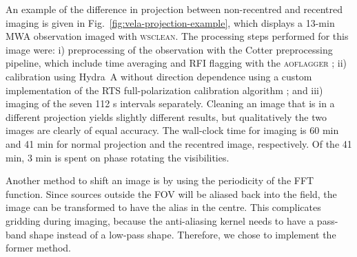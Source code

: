 \documentclass[useAMS,usenatbib]{mn2e}
\begin{document}
An example of the difference in projection between non-recentred and recentred imaging is given in Fig.~\ref{fig:vela-projection-example}, which displays a 13-min MWA observation imaged with \textsc{wsclean}. The processing steps performed for this image were: i) preprocessing of the observation with the Cotter preprocessing pipeline, which include time averaging and RFI flagging with the \textsc{aoflagger} \citep{post-correlation-rfi-classification,scale-invariant-rank-operator}; ii) calibration using Hydra~A without direction dependence using a custom implementation of the RTS full-polarization calibration algorithm \citep{rts-mwa}; and iii) imaging of the seven 112 s intervals separately. Cleaning an image that is in a different projection yields slightly different results, but qualitatively the two images are clearly of equal accuracy. The wall-clock time for imaging is 60 min and 41 min for normal projection and the recentred image, respectively. Of the 41 min, 3 min is spent on phase rotating the visibilities.

Another method to shift an image is by using the periodicity of the FFT function. Since sources outside the FOV will be aliased back into the field, the image can be transformed to have the alias in the centre. This complicates gridding during imaging, because the anti-aliasing kernel needs to have a pass-band shape instead of a low-pass shape. Therefore, we chose to implement the former method.
\end{document}
